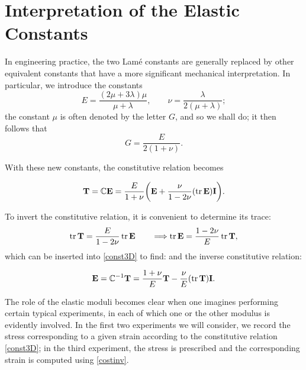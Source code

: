 \section{Interpretation of the Elastic Constants}
In engineering practice, the two Lamé constants are generally replaced by other equivalent constants that have a more significant mechanical interpretation. In particular, we introduce the constants
\begin{equation}
	E=\frac{(2\mu+3\lambda)\mu}{\mu+\lambda}, \qquad \nu = \frac{\lambda}{2(\mu+\lambda)};
\end{equation}
the constant $\mu$ is often denoted by the letter $G$, and so we shall do; it then follows that
\begin{equation}
	G=\frac{E}{2(1+\nu)}.
\end{equation}

With these new constants, the constitutive relation becomes
\begin{definition}
	\begin{equation}\label{const3D}
		\mathbf{T}=\mathbb{C} \mathbf{E}=\frac{E}{1+\nu}{\left(\mathbf{E}+\frac{\nu}{1-2\nu}(\operatorname{tr}\mathbf{E})\mathbf{I}\right)}.
	\end{equation}
\end{definition}

To invert the constitutive relation, it is convenient to determine its trace:
\begin{equation}
	\operatorname{tr}\mathbf{T}=\frac{E}{1-2\nu} \operatorname{tr}\mathbf{E} \qquad \Longrightarrow \operatorname{tr}\mathbf{E} =\frac{1-2\nu}{E}\operatorname{tr}\mathbf{T},
\end{equation} 
which can be inserted into \eqref{const3D} to find:
and the inverse constitutive relation:
\begin{definition}
	\begin{equation}\label{costinv}
		\mathbf{E}=\mathbb{C}^{-1}\mathbf{T}=\frac{1+\nu}{E}\mathbf{T}-\frac{\nu}{E}(\operatorname{tr}\mathbf{T})\mathbf{I}.
	\end{equation}
\end{definition}
The role of the elastic moduli becomes clear when one imagines performing certain typical experiments, in each of which one or the other modulus is evidently involved. In the first two experiments we will consider, we record the stress corresponding to a given strain according to the constitutive relation \eqref{const3D}; in the third experiment, the stress is prescribed and the corresponding strain is computed using \eqref{costinv}.

